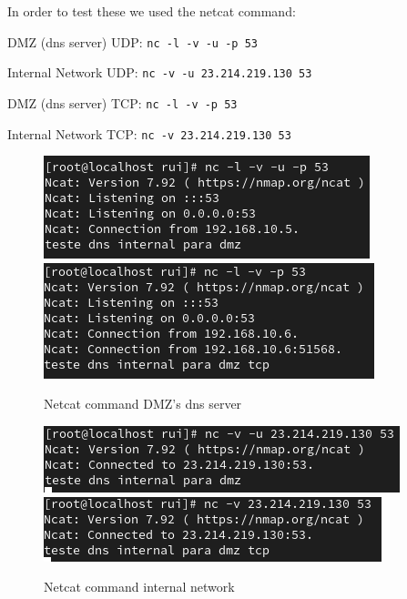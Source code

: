 \documentclass{article}
\begin{document}
In order to test these we used the netcat command:
\texttt{}\par
\texttt{}\par
DMZ (dns server) UDP: \texttt{nc -l -v -u -p 53} \par
Internal Network UDP: \texttt{nc -v -u 23.214.219.130 53} \par
\texttt{}\par
\texttt{}\par
DMZ (dns server) TCP: \texttt{nc -l -v -p 53} \par
Internal Network TCP: \texttt{nc -v 23.214.219.130 53} \par
\texttt{}\par
\begin{figure}[H]
    \centering
    \includegraphics[scale=0.5]{btw/btw_dns_dmz.png}
    \includegraphics[scale=0.5]{btw/btw_dns_dmz_tcp.png}
    \caption{Netcat command DMZ's dns server}
    \label{fig:network-arc}
\end{figure}

\begin{figure}[H]
    \centering
    \includegraphics[scale=0.5]{btw/btw_dns_internal.png}
    \includegraphics[scale=0.5]{btw/btw_dns_internal_tcp.png}
    \caption{Netcat command internal network}
    \label{fig:network-arc}
\end{figure}
\end{document}
